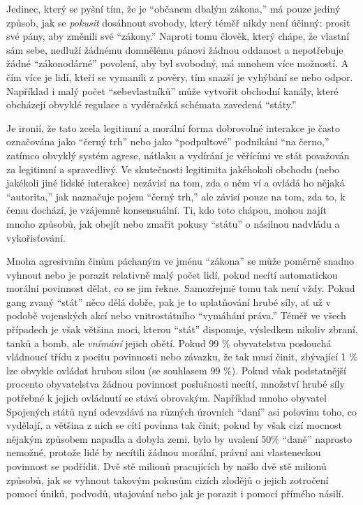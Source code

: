 \documentclass{book}
\begin{document}
Jedinec, který se pyšní tím, že je \enquote{občanem dbalým zákona,} má pouze jediný způsob, jak se \emph{pokusit} dosáhnout svobody, který téměř nikdy není účinný: prosit své pány, aby změnili své \enquote{zákony.} Naproti tomu člověk, který chápe, že vlastní sám sebe, nedluží žádnému domnělému pánovi žádnou oddanost a nepotřebuje žádné \enquote{zákonodárné} povolení, aby byl svobodný, má mnohem více možností. A čím více je lidí, kteří se vymanili z pověry, tím snazší je vyhýbání se nebo odpor. Například i malý počet \enquote{sebevlastníků} může vytvořit obchodní kanály, které obcházejí obvyklé regulace a vyděračská schémata zavedená \enquote{státy.}

Je ironií, že tato zcela legitimní a morální forma dobrovolné interakce je často označována jako \enquote{černý trh} nebo jako \enquote{podpultové} podnikání \enquote{na černo,} zatímco obvyklý systém agrese, nátlaku a vydírání je věřícími ve stát považován za legitimní a spravedlivý. Ve skutečnosti legitimita jakéhokoli obchodu (nebo jakékoli jiné lidské interakce) nezávisí na tom, zda o něm ví a ovládá ho nějaká \enquote{autorita,} jak naznačuje pojem \enquote{černý trh,} ale závisí pouze na tom, zda to, k čemu dochází, je vzájemně konsensuální. Ti, kdo toto chápou, mohou najít mnoho způsobů, jak obejít nebo zmařit pokusy \enquote{státu} o násilnou nadvládu a vykořisťování.

Mnoha agresivním činům páchaným ve jménu \enquote{zákona} se může poměrně snadno vyhnout nebo je porazit relativně malý počet lidí, pokud necítí automatickou morální povinnost dělat, co se jim řekne. Samozřejmě tomu tak není vždy. Pokud gang zvaný \enquote{stát} něco dělá dobře, pak je to uplatňování hrubé síly, ať už v podobě vojenských akcí nebo vnitrostátního \enquote{vymáhání práva.} Téměř ve všech případech je však většina moci, kterou \enquote{stát} disponuje, výsledkem nikoliv zbraní, tanků a bomb, ale \emph{vnímání} jejich obětí. Pokud 99 \% obyvatelstva poslouchá vládnoucí třídu z pocitu povinnosti nebo závazku, že tak musí činit, zbývající 1 \% lze obvykle ovládat hrubou silou (se souhlasem 99 \%). Pokud však podstatnější procento obyvatelstva žádnou povinnost poslušnosti necítí, množství hrubé síly potřebné k jejich ovládnutí se stává obrovským. Například mnoho obyvatel Spojených států nyní odevzdává na různých úrovních \enquote{daní} asi polovinu toho, co vydělají, a většina z nich se cítí povinna tak činit; pokud by však cizí mocnost nějakým způsobem napadla a dobyla zemi, bylo by uvalení 50\% \enquote{daně} naprosto nemožné, protože lidé by necítili žádnou morální, právní ani vlasteneckou povinnost se podřídit. Dvě stě milionů pracujících by našlo dvě stě milionů způsobů, jak se vyhnout takovým pokusům cizích zlodějů o jejich zotročení pomocí úniků, podvodů, utajování nebo jak je porazit i pomocí přímého násilí.
\end{document}
